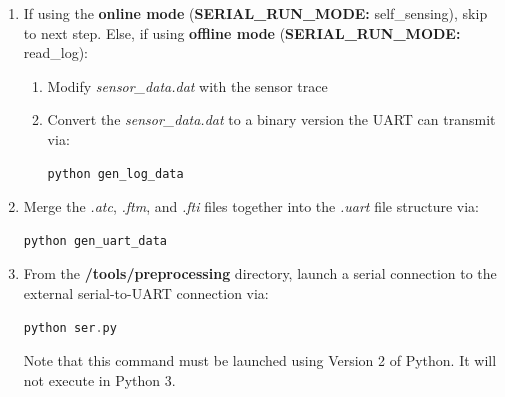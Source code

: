 \begin{enumerate}
	\item If using the \textbf{online mode} (\textbf{SERIAL\_RUN\_MODE:} self\_sensing), skip to next step. Else, if using \textbf{offline mode} (\textbf{SERIAL\_RUN\_MODE:} read\_log):
	\begin{enumerate}
		\item Modify \textit{sensor\_data.dat} with the sensor trace
		\item Convert the \textit{sensor\_data.dat} to a binary version the UART can transmit via:
	\begin{lstlisting}[language=C]
	python gen_log_data
	\end{lstlisting}
	\end{enumerate}


	\item Merge the \textit{.atc}, \textit{.ftm}, and \textit{.fti} files together into the \textit{.uart} file structure via: 
	\begin{lstlisting}[language=C]
	python gen_uart_data
	\end{lstlisting}

	\item From the \textbf{/tools/preprocessing} directory, launch a serial connection to the external serial-to-UART connection via: 
	\begin{lstlisting}[language=C]
	python ser.py
	\end{lstlisting}
	Note that this command must be launched using Version 2 of Python. It will not execute in Python 3.
	
\end{enumerate}

\clearpage
